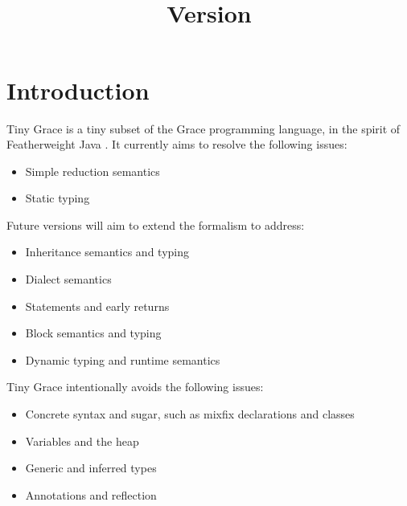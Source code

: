 \documentclass[a4paper, 11pt]{article}
\title{\thetitle\\\normalsize\vspace{0.5em}Version \version\vspace{-0.5em}}
\author{\theauthor}
\begin{document}
\maketitle\vspace{-2em}

\section{Introduction}

Tiny Grace is a tiny subset of the Grace programming language, in the spirit of
Featherweight Java \cite{fj}.  It currently aims to resolve the following
issues:

\begin{itemize}

    \item Simple reduction semantics

    \item Static typing

\end{itemize}

\noindent Future versions will aim to extend the formalism to address:

\begin{itemize}

    \item Inheritance semantics and typing

    \item Dialect semantics

    \item Statements and early returns

    \item Block semantics and typing

    \item Dynamic typing and runtime semantics

\end{itemize}

\noindent Tiny Grace intentionally avoids the following issues:

\begin{itemize}

    \item Concrete syntax and sugar, such as mixfix declarations and classes

    \item Variables and the heap

    \item Generic and inferred types

    \item Annotations and reflection

\end{itemize}
\end{document}
